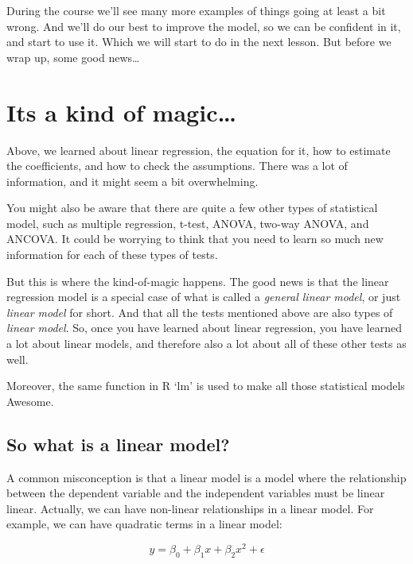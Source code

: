 \documentclass[
  letterpaper,
  8pt,
  a4paper]{book}
\begin{document}
During the course we'll see many more examples of things going at least
a bit wrong. And we'll do our best to improve the model, so we can be
confident in it, and start to use it. Which we will start to do in the
next lesson. But before we wrap up, some good news\ldots{}

\section*{Its a kind of magic\ldots{}}\label{its-a-kind-of-magic}


Above, we learned about linear regression, the equation for it, how to
estimate the coefficients, and how to check the assumptions. There was a
lot of information, and it might seem a bit overwhelming.

You might also be aware that there are quite a few other types of
statistical model, such as multiple regression, t-test, ANOVA, two-way
ANOVA, and ANCOVA. It could be worrying to think that you need to learn
so much new information for each of these types of tests.

But this is where the kind-of-magic happens. The good news is that the
linear regression model is a special case of what is called a
\emph{general linear model}, or just \emph{linear model} for short. And
that all the tests mentioned above are also types of \emph{linear
model}. So, once you have learned about linear regression, you have
learned a lot about linear models, and therefore also a lot about all of
these other tests as well.

Moreover, the same function in R `lm' is used to make all those
statistical models Awesome.

\subsection*{So what is a linear
model?}\label{so-what-is-a-linear-model}

A common misconception is that a linear model is a model where the
relationship between the dependent variable and the independent
variables must be linear linear. Actually, we can have non-linear
relationships in a linear model. For example, we can have quadratic
terms in a linear model:

\[y = \beta_0 + \beta_1 x + \beta_2 x^2 + \epsilon\]
\end{document}
